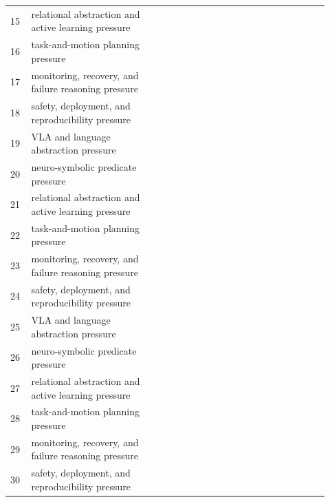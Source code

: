 \documentclass[11pt]{article}
\begin{document}
\begin{longtable}{p{0.06\linewidth}p{0.38\linewidth}p{0.48\linewidth}}
15 & relational abstraction and active learning pressure & \citep{chen2024languageaugmented43,dogangun2026bilevel44,mizoguchi2022abstractionbased45} \\
16 & task-and-motion planning pressure & \citep{coluzzi2017language46,hemken2023how47,shah2024learning48} \\
17 & monitoring, recovery, and failure reasoning pressure & \citep{kwon2025fast49,shirai2023visionlanguage50,kwon2024fast51} \\
18 & safety, deployment, and reproducibility pressure & \citep{tosello2026interleaving52,johnson2018research53,wachter2018integrating54} \\
19 & VLA and language abstraction pressure & \citep{huang2022inner55,francis2023core56,kostin2025padlabeling57} \\
20 & neuro-symbolic predicate pressure & \citep{jia2024langsuite58,yu2025mowm59,li2026worldvalueaction60} \\
21 & relational abstraction and active learning pressure & \citep{liu2026agentic61,chen2025codeassymbolicplanner62,lorang2026build63} \\
22 & task-and-motion planning pressure & \citep{yang2026nesyroute64,din2025lang2manip65,zhai2026cascading66} \\
23 & monitoring, recovery, and failure reasoning pressure & \citep{yevdokymov2024neurosymbolic67,cai2024neusis68,ref2026multimodal69} \\
24 & safety, deployment, and reproducibility pressure & \citep{jung2020software70,hwang2025how71,wang2025where72} \\
25 & VLA and language abstraction pressure & \citep{shah2023reliable73,he2024utilizing74,skerrett2016moving75} \\
26 & neuro-symbolic predicate pressure & \citep{sunndfrontiers76,suriani2026modeling77,slaouindsairobotics78} \\
27 & relational abstraction and active learning pressure & \citep{ali2026neurosymbolic79,p2025proactive80,slaoui2026sairobotics81} \\
28 & task-and-motion planning pressure & \citep{silver2022learning82,song2025rcienhanced83,hu2025reinforcement84} \\
29 & monitoring, recovery, and failure reasoning pressure & \citep{chen2025multimodal85,lan2025active86,niu2025research87} \\
30 & safety, deployment, and reproducibility pressure & \citep{byrd2026constrained88,son2026software89,moncadaramirez2025agentic90} \\

\end{longtable}
\end{document}
